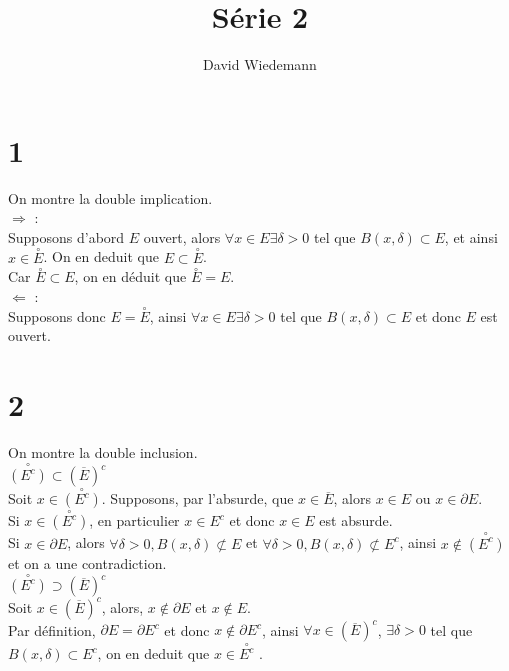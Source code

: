\documentclass[11pt, a4paper]{article}
\newcommand{\del}{\partial}
\begin{document}
\title{Série 2}
\author{David Wiedemann}
\maketitle
\section*{1}
On montre la double implication.\\
$ \Rightarrow $ :\\
Supposons d'abord $E$ ouvert, alors $\forall x \in E \exists \delta >0$ tel que $B( x,\delta) \subset E$, et ainsi $x \in \overset{\circ}{E}$. On en deduit que $E \subset \overset{\circ}{E}$.\\
Car $\overset{\circ}{E} \subset E$, on en déduit que $\overset{\circ}{E} =E$.\\
$\Leftarrow $ :\\
Supposons donc $E= \overset{\circ}{E}$, ainsi $\forall x \in E \exists \delta >0  $ tel que $  B( x, \delta) \subset E $ et donc $E$ est ouvert.
\section*{2}
On montre la double inclusion.\\
$\overset{\circ}{( E^{c} )} \subset ( \overline{E})^{c} $ \\
Soit $x \in \overset{\circ}{( E^{c} )}$. Supposons, par l'absurde, que $x \in \overline{E}$, alors $x \in E $ ou $x \in \del E$.\\
Si $x \in \overset{\circ}{( E^{c} )}$, en particulier $x \in E^{c}$ et donc $x \in E$ est absurde.\\
Si $x \in \del E$, alors $\forall \delta >0,B(x, \delta ) \not\subset E$ et $\forall \delta >0,B(x, \delta ) \not\subset E^{c}$, ainsi $x \notin \overset{\circ}{( E^{c} )}$ et on a une contradiction.\\
$\overset{\circ}{( E^{c} )} \supset ( \overline{E})^{c} $ \\
Soit $x \in ( \overline{E} )^{c}$, alors, $x \notin \del E$ et $x \notin E$.\\
Par définition, $\del E = \del E^{c}$ et donc $x \notin \del E^{c}$, ainsi $\forall x \in ( \overline{E})^{c}$, $\exists  \delta >0 $ tel que $B( x, \delta) \subset E^{c}$, on en deduit que $ x\in \overset{\circ}{E^{c}}$	.
\end{document}
